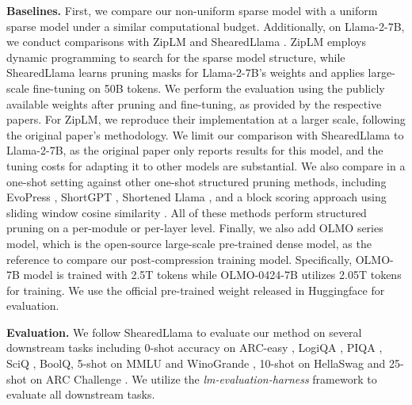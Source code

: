 \noindent \textbf{Baselines.} First, we compare our non-uniform sparse model with a uniform sparse model under a similar computational budget. Additionally, on Llama-2-7B, we conduct comparisons with ZipLM \citep{kurtic2023ziplm} and ShearedLlama \citep{xia2023sheared}. ZipLM employs dynamic programming to search for the sparse model structure, while ShearedLlama learns pruning masks for Llama-2-7B's weights and applies large-scale fine-tuning on 50B tokens. We perform the evaluation using the publicly available weights after pruning and fine-tuning, as provided by the respective papers. For ZipLM, we reproduce their implementation at a larger scale, following the original paper's methodology. We limit our comparison with ShearedLlama to Llama-2-7B, as the original paper only reports results for this model, and the tuning costs for adapting it to other models are substantial. We also compare \sysname in a one-shot setting against other one-shot structured pruning methods, including EvoPress \citep{sieberling2024evopress}, ShortGPT \citep{men2024shortgpt}, Shortened Llama \citep{kim2024shortened}, and a block scoring approach using sliding window cosine similarity \cite{gromov2024unreasonable}. All of these methods perform structured pruning on a per-module or per-layer level. Finally, we also add OLMO \cite{groeneveld2024olmo} series model, which is the open-source large-scale pre-trained dense model, as the reference to compare our post-compression training model. 
Specifically, OLMO-7B model is trained with 2.5T tokens while OLMO-0424-7B utilizes 2.05T tokens for training. We use the official pre-trained weight released in Huggingface for evaluation.



\noindent \textbf{Evaluation.} We follow ShearedLlama \citep{xia2023sheared} to evaluate our method on several downstream tasks including 0-shot accuracy on ARC-easy \citep{clark2018think}, LogiQA \citep{liu2020logiqa}, PIQA \citep{bisk2020piqa}, SciQ \citep{welbl2017crowdsourcing}, BoolQ\citep{clark2019boolq}, 5-shot on MMLU \citep{hendrycks2020measuring} and WinoGrande \citep{sakaguchi2021winogrande}, 10-shot on HellaSwag \citep{zellers2019hellaswag} and 25-shot on ARC Challenge \citep{clark2018think}. We utilize the \textit{lm-evaluation-harness} framework \citep{gao10256836framework} to evaluate all downstream tasks.

